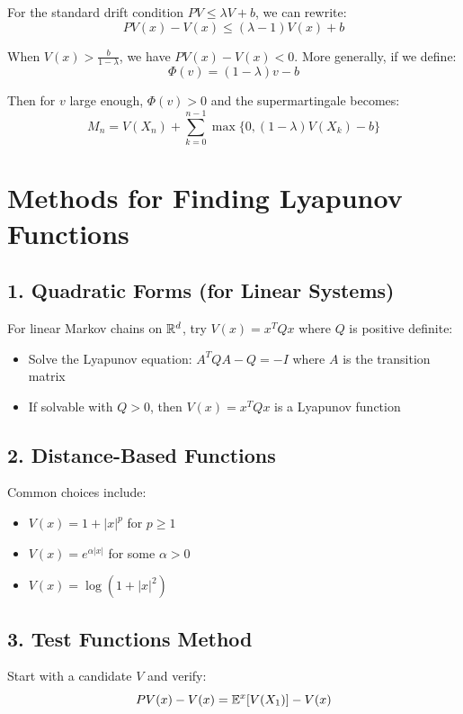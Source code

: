 \documentclass{amsart}
\let\originalmathbb\mathbb
\renewcommand{\mathbb}[1]{%
    \ifstrequal{#1}{1}{\mathbbm{#1}}{\originalmathbb{#1}}%
}
\theoremstyle{plain}
\theoremstyle{definition}
\theoremstyle{remark}
\begin{document}
For the standard drift condition $PV \leq \lambda V + b$, we can rewrite:
\[
PV(x) - V(x) \leq (\lambda - 1)V(x) + b
\]

When $V(x) > \frac{b}{1-\lambda}$, we have $PV(x) - V(x) < 0$. More generally, if we define:
\[
\Phi(v) = (1-\lambda)v - b
\]

Then for $v$ large enough, $\Phi(v) > 0$ and the supermartingale becomes:
\[
M_n = V(X_n) + \sum_{k=0}^{n-1}\max\{0, (1-\lambda)V(X_k) - b\}
\]

\section{Methods for Finding Lyapunov Functions}

\subsection{1. Quadratic Forms (for Linear Systems)}

For linear Markov chains on $\mathbb{R}^d$, try $V(x) = x^T Q x$ where $Q$ is positive definite:

\begin{itemize}
	\item Solve the Lyapunov equation: $A^T Q A - Q = -I$ where $A$ is the transition matrix
	\item If solvable with $Q > 0$, then $V(x) = x^T Q x$ is a Lyapunov function
\end{itemize}

\subsection{2. Distance-Based Functions}

Common choices include:

\begin{itemize}
	\item $V(x) = 1 + |x|^p$ for $p \geq 1$
	\item $V(x) = e^{\alpha |x|}$ for some $\alpha > 0$
	\item $V(x) = \log(1 + |x|^2)$
\end{itemize}

\subsection{3. Test Functions Method}

Start with a candidate $V$ and verify:
\[
PV(x) - V(x) = \mathbb{E}^x[V(X_1)] - V(x)
\]
\end{document}
